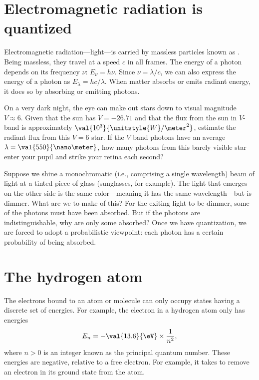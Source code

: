 
\section{Electromagnetic radiation is quantized}

Electromagnetic radiation---light---is carried by massless particles known as . Being massless, they travel at a speed $c$ in all frames.  The energy of a photon depends on its frequency $\nu$: $E_{\nu} = h\nu$. Since $\nu = \lambda/c$, we can also express the energy of a photon as $E_{\lambda} = hc/\lambda$. When matter absorbs or emits radiant energy, it does so by absorbing or emitting photons.

\begin{exercisebox}
On a very dark night, the eye can make out stars down to visual magnitude $V\approx 6$. Given that the sun has $V=-26.71$ and that the flux from the sun in $V$-band is approximately $\val{10^{3}}{\unitstyle{W}/\meter^{2}}$, estimate the radiant flux from this $V=6$ star.  If the $V$ band photons have an average $\lambda = \val{550}{\nano\meter}$, how many photons from this barely visible star enter your pupil and strike your retina each second?
\end{exercisebox}

Suppose we shine a monochromatic (i.e., comprising a single wavelength) beam of light at a tinted piece of glass (sunglasses, for example).  The light that emerges on the other side is the same color---meaning it has the same wavelength---but is dimmer. What are we to make of this? For the exiting light to be dimmer, some of the photons must have been absorbed. But if the photons are indistinguishable, why are only some absorbed? Once we have quantization, we are forced to adopt a probabilistic viewpoint: each photon has a certain probability of being absorbed.

\section{The hydrogen atom}

The electrons bound to an atom or molecule can only occupy states having a discrete set of energies. For example, the electron in a hydrogen atom only has energies
\begin{equation}\label{e.H-levels}
	E_{n} = -\val{13.6}{\eV}\times \frac{1}{n^{2}},
\end{equation}
where $n > 0$ is an integer known as the principal quantum number.  These energies are negative, relative to a free electron.  For example, it takes  to remove an electron in its ground state from the atom.

